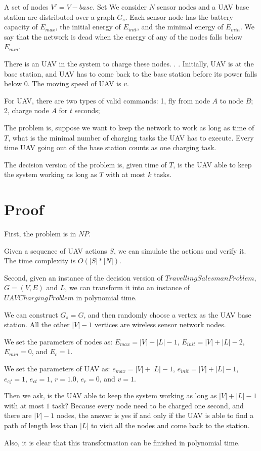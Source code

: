 A set of nodes $V' = V - {base}$.
Set
We consider $N$ sensor nodes and a UAV base station are distributed over a graph $G_s$. Each sensor node has the battery capacity of $E_{max}$, the initial energy of $E_{init}$, and the minimal energy of $E_{min}$. We say that the network is dead when the energy of any of the nodes falls below $E_{min}$. 

There is an UAV in the system to charge these nodes. .   . Initially, UAV is at the base station, and UAV has to come back to the base station before its power falls below $0$. The moving speed of UAV is $v$.

For UAV, there are two types of valid commands:
1, fly from node $A$ to node $B$;
2, charge node $A$ for $t$ seconds;

The problem is, suppose we want to keep the network to work as long as time of $T$, what is the minimal number of charging tasks the UAV has to execute. Every time UAV going out of the base station counts as one charging task.

The decision version of the problem is, given time of $T$, is the UAV able to keep the system working as long as $T$ with at most $k$ tasks.
\section{Proof}

First, the problem is in $NP$.

Given a sequence of UAV actions $S$, we can simulate the actions and verify it. The time complexity is $O(|S| * |N|)$.

Second, given an instance of the decision version of $Travelling Salesman Problem$, $G = (V, E)$ and $L$, we can transform it into an instance of $UAV Charging Problem$ in polynomial time.

We can construct $G_s = G$, and then randomly choose a vertex as the UAV base station. All the other $|V|-1$ vertices are wireless sensor network nodes.

We set the parameters of nodes as: $E_{max} = |V| + |L| - 1$, $E_{init} = |V| + |L| - 2$, $E_{min} = 0$, and $E_{c} = 1$.

We set the parameters of UAV as: $e_{max} = |V| + |L| - 1$, $e_{init} = |V| + |L| - 1$, $e_{cf} = 1$, $e_{ct} = 1$, $r = 1.0$, $e_r = 0$, and $v = 1$.

Then we ask, is the UAV able to keep the system working as long as $|V| + |L| - 1$ with at most $1$ task? Because every node need to be charged one second, and there are $|V|-1$ nodes, the answer is yes if and only if the UAV is able to find a path of length less than $|L|$ to visit all the nodes and come back to the station.

Also, it is clear that this transformation can be finished in polynomial time.
